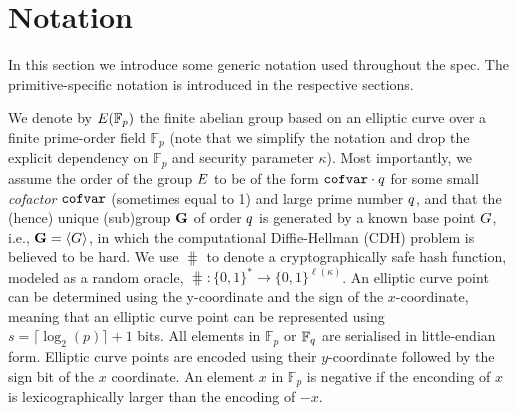 \section{Notation}
\label{sec:notation}
In this section we introduce some generic notation used throughout the spec. The
primitive-specific notation is introduced in the respective sections.

We denote by $E(\mathbb{F}_p)$ the finite abelian group based on an elliptic curve over a finite prime-order field
$\mathbb{F}_p$ (note that we simplify the notation and drop the explicit dependency on $\mathbb{F}_p$ and security
parameter $\kappa$). Most importantly, we assume the order of the group $E$ to be of the form $\texttt{cofvar}\cdot q$
for some small \emph{cofactor} $\texttt{cofvar}$ (sometimes equal to 1) and large prime number $q$, and that the (hence)
unique (sub)group $\mathbf{G}$ of order $q$ is generated by a known base point $G$, i.e., $\mathbf{G} =
\langle G\rangle$,  in which the computational Diffie-Hellman (CDH) problem is believed to be hard. We use
$\hash$ to denote a cryptographically safe hash function, modeled as a random oracle, $\hash: \{0,
1\}^*\rightarrow\{0,1\}^{\ell(\kappa)}$. An elliptic curve point can be determined using the y-coordinate and the sign of the
$x$-coordinate, meaning that an elliptic curve point can be represented using $s=\lceil\log_2(p)\rceil + 1$ bits.
All elements in $\mathbb{F}_p$ or $\mathbb{F}_{q}$ are serialised in little-endian form. Elliptic curve points
are encoded using their $y$-coordinate followed by the sign bit of the $x$ coordinate. An element $x$ in $\mathbb{F}_p$
is negative if the enconding of $x$ is lexicographically larger than the encoding of $-x$.